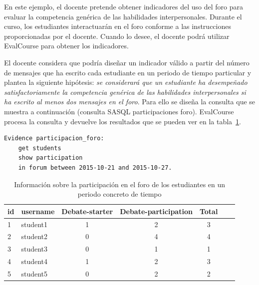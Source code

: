 			En este ejemplo, el docente pretende obtener indicadores del uso del foro para evaluar la competencia genérica de las habilidades interpersonales. Durante el curso, los estudiantes interactuarán en el foro conforme a las instrucciones proporcionadas por el docente. Cuando lo desee, el docente podrá utilizar EvalCourse para obtener los indicadores.


			El docente considera que podría diseñar un indicador válido a partir del número de mensajes que ha escrito cada estudiante en un periodo de tiempo particular y plantea la siguiente hipótesis: \emph{se considerará que un estudiante ha desempeñado satisfactoriamente la competencia genérica de las habilidades interpersonales si ha escrito al menos dos mensajes en el foro}. Para ello se diseña la consulta que se muestra a continuación (consulta SASQL participaciones foro). EvalCourse procesa la consulta y devuelve los resultados que se pueden ver en la tabla~\ref{tab:EvalCourseEj1}.






\begin{verbatim}
Evidence participacion_foro: 
	get students
	show participation
	in forum between 2015-10-21 and 2015-10-27.
\end{verbatim}


\begin{table}
	\centering
	\caption{Información sobre la participación en el foro de los estudiantes en un periodo concreto de tiempo}
	\label{tab:EvalCourseEj1}
	\begin{tabular}{|l|l|c|c|c|c|c|}
		\hline
		id & username & Debate-starter & Debate-participation & Total \\
		\hline
		\hline
		1 & student1 & 1 & 2 & 3  \\
		\hline
		2 & student2 & 0 & 4 & 4  \\
		\hline
		3 & student3 & 0 & 1 & 1  \\
		\hline
		4 & student4 & 1 & 2 & 3  \\
		\hline
		5 & student5 & 0 & 2 & 2  \\
		\hline
	\end{tabular}
\end{table}

